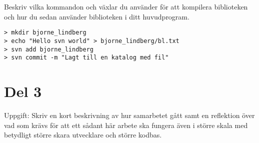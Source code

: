 \documentclass[10pt, a4paper]{article}
\begin{document}
Beskriv vilka kommandon och växlar du använder för att kompilera biblioteken och hur du sedan använder biblioteken i ditt huvudprogram.
 
\begin{verbatim}
> mkdir bjorne_lindberg
> echo "Hello svn world" > bjorne_lindberg/bl.txt
> svn add bjorne_lindberg
> svn commit -m "Lagt till en katalog med fil"
\end{verbatim}

\cleardoublepage

\section*{Del 3}\label{sec:del3}

Uppgift:
Skriv en kort beskrivning av hur samarbetet gått samt en reflektion över vad som krävs för att ett sådant här arbete ska fungera även i större skala med betydligt större skara utvecklare och större kodbas.
 





%  
\end{document}
